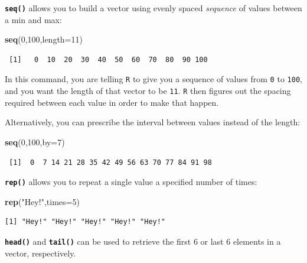 \documentclass[
]{book}
\newenvironment{Shaded}{\begin{snugshade}}{\end{snugshade}}
\newcommand{\DataTypeTok}[1]{\textcolor[rgb]{0.13,0.29,0.53}{#1}}
\newcommand{\DecValTok}[1]{\textcolor[rgb]{0.00,0.00,0.81}{#1}}
\newcommand{\KeywordTok}[1]{\textcolor[rgb]{0.13,0.29,0.53}{\textbf{#1}}}
\newcommand{\NormalTok}[1]{#1}
\newcommand{\StringTok}[1]{\textcolor[rgb]{0.31,0.60,0.02}{#1}}
\begin{document}
\textbf{\texttt{seq()}} allows you to build a vector using evenly spaced \emph{sequence} of values between a min and max:

\begin{Shaded}
\begin{Highlighting}[]
\KeywordTok{seq}\NormalTok{(}\DecValTok{0}\NormalTok{,}\DecValTok{100}\NormalTok{,}\DataTypeTok{length=}\DecValTok{11}\NormalTok{)}
\end{Highlighting}
\end{Shaded}

\begin{verbatim}
 [1]   0  10  20  30  40  50  60  70  80  90 100
\end{verbatim}

In this command, you are telling \texttt{R} to give you a sequence of values from \texttt{0} to \texttt{100}, and you want the length of that vector to be \texttt{11}. \texttt{R} then figures out the spacing required between each value in order to make that happen.

Alternatively, you can prescribe the interval between values instead of the length:

\begin{Shaded}
\begin{Highlighting}[]
\KeywordTok{seq}\NormalTok{(}\DecValTok{0}\NormalTok{,}\DecValTok{100}\NormalTok{,}\DataTypeTok{by=}\DecValTok{7}\NormalTok{)}
\end{Highlighting}
\end{Shaded}

\begin{verbatim}
 [1]  0  7 14 21 28 35 42 49 56 63 70 77 84 91 98
\end{verbatim}

\textbf{\texttt{rep()}} allows you to repeat a single value a specified number of times:

\begin{Shaded}
\begin{Highlighting}[]
\KeywordTok{rep}\NormalTok{(}\StringTok{"Hey!"}\NormalTok{,}\DataTypeTok{times=}\DecValTok{5}\NormalTok{)}
\end{Highlighting}
\end{Shaded}

\begin{verbatim}
[1] "Hey!" "Hey!" "Hey!" "Hey!" "Hey!"
\end{verbatim}

\textbf{\texttt{head()}} and \textbf{\texttt{tail()}} can be used to retrieve the first 6 or last 6 elements in a vector, respectively.
\end{document}
